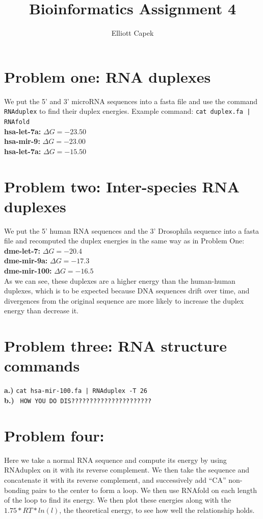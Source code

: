 \documentclass[10pt]{article} %
\title{Bioinformatics Assignment 4}
\author{Elliott Capek}
\begin{document}
\maketitle{}

\section{Problem one: RNA duplexes}
We put the 5' and 3' microRNA sequences into a fasta file and use the command
\texttt{RNAduplex} to find their duplex energies. Example command:
\texttt{cat duplex.fa | RNAfold}\\

\textbf{hsa-let-7a: } $\Delta G = -23.50$\\
\textbf{hsa-mir-9: } $\Delta G = -23.00$\\
\textbf{hsa-let-7a: } $\Delta G = -15.50$\\

\section{Problem two: Inter-species RNA duplexes}
We put the 5' human RNA sequences and the 3' Drosophila sequence into a fasta file
and recomputed the duplex energies in the same way as in Problem One:
\textbf{dme-let-7: } $\Delta G = -20.4$\\
\textbf{dme-mir-9a: } $\Delta G = -17.3$\\
\textbf{dme-mir-100: } $\Delta G = -16.5$\\

As we can see, these duplexes are a higher energy than the human-human duplexes, which
is to be expected because DNA sequences drift over time, and divergences from the
original sequence are more likely to increase the duplex energy than decrease it.\\

\section{Problem three: RNA structure commands}
\textbf{a.)} \texttt{cat hsa-mir-100.fa | RNAduplex -T 26}\\
\textbf{b.)} \texttt{ HOW YOU DO DIS??????????????????????}\\

\section{Problem four: }
Here we take a normal RNA sequence and compute its energy by using RNAduplex on it with
its reverse complement. We then take the sequence and concatenate it with its reverse
complement, and successively add ``CA'' non-bonding pairs to the center to form a
loop. We then use RNAfold on each length of the loop to find its energy. We then plot
these energies along with the $1.75*RT*ln(l)$, the theoretical energy, to see how
well the relationship holds.\\
\end{document}
